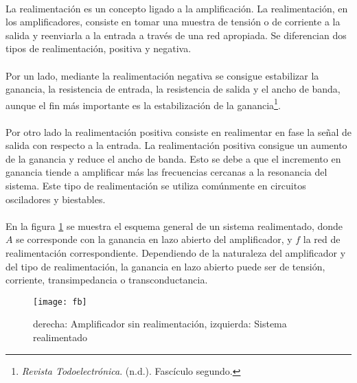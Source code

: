 \paragraph{}
La realimentación es un concepto ligado a la amplificación.
La realimentación, en los amplificadores, consiste en tomar una muestra de tensión o de corriente a la salida y reenviarla a la entrada a través de una red apropiada.
Se diferencian dos tipos de realimentación, positiva y negativa.
\paragraph{}
Por un lado, mediante la realimentación negativa se consigue estabilizar la ganancia, la resistencia de entrada, la resistencia de salida y el ancho de banda, aunque el fin más importante es la estabilización de la ganancia\footnote{\textit{Revista Todoelectrónica}. (n.d.). Fascículo segundo.}.
\paragraph{}
Por otro lado la realimentación positiva consiste en realimentar en fase la señal de salida con respecto a la entrada. La realimentación positiva consigue un aumento de la ganancia y reduce el ancho de banda. Esto se debe a que el incremento en ganancia tiende a amplificar más las frecuencias cercanas a la resonancia del sistema. Este tipo de realimentación se utiliza comúnmente en circuitos osciladores y biestables.
\paragraph{}
En la figura \ref{fig:fb} se muestra el esquema general de un sistema realimentado, donde $A$ se corresponde con la ganancia en lazo abierto del amplificador, y $f$ la red de realimentaci\'on correspondiente. Dependiendo de la naturaleza del amplificador y del tipo de realimentación, la ganancia en lazo abierto puede ser de tensión, corriente, transimpedancia o transconductancia.
\begin{figure}[h]
    \centering
    \texttt{[image: fb]}
    \caption{derecha: Amplificador sin realimentaci\'on, izquierda: Sistema realimentado} 
    \label{fig:fb}
\end{figure}
